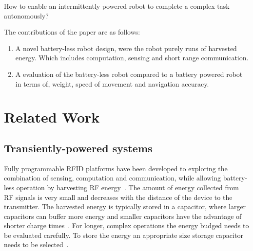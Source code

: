 \documentclass[letterpaper, 10 pt, conference]{ieeeconf}  %
\begin{document}

How to enable an intermittently powered robot to complete a complex task autonomously?


The contributions of the paper are as follows:

\begin{enumerate}
\item A novel battery-less robot design, were the robot purely runs of harvested energy. Which includes computation, sensing and short range communication.

\item A evaluation of the battery-less robot compared to a battery powered robot in terms of, weight, speed of movement and navigation accuracy.
\end{enumerate}
 

\section{Related Work}

\subsection{Transiently-powered systems}

Fully programmable RFID platforms have been developed to exploring the combination of sensing, computation and communication, while allowing battery-less operation by harvesting RF energy~\cite{sample_transim_2008}.
The amount of energy collected from RF signals is very small and decreases with the distance of the device to the transmitter.
The harvested energy is typically stored in a capacitor, where larger capacitors can buffer more energy and smaller capacitors have the advantage of shorter charge times~\cite{gummerson_mobisys_2010}.
For longer, complex operations the energy budged needs to be evaluated carefully.
To store the energy an appropriate size storage capacitor needs to be selected~\cite{naderiparizi_rfid_2015}.

\end{document}

